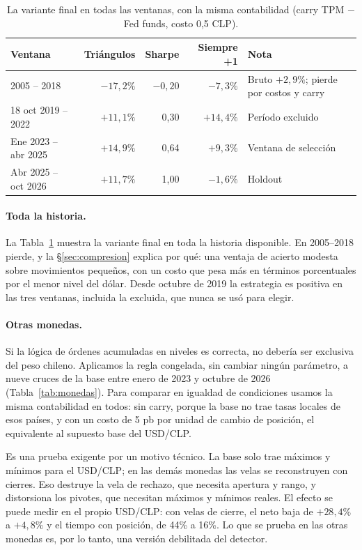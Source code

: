 \documentclass[10pt,a4paper]{article}
\begin{document}
\begin{table}[htbp]\centering\small
\begin{tabular}{@{}lrrrl@{}}
\toprule
Ventana & Triángulos & Sharpe & Siempre +1 & Nota \\
\midrule
2005 -- 2018            & $-17{,}2\%$ & $-0{,}20$ & $-7{,}3\%$  & Bruto $+2{,}9\%$; pierde por costos y carry \\
18 oct 2019 -- 2022     & $+11{,}1\%$ & 0,30      & $+14{,}4\%$ & Período excluido \\
Ene 2023 -- abr 2025    & $+14{,}9\%$ & 0,64      & $+9{,}3\%$  & Ventana de selección \\
Abr 2025 -- oct 2026    & $+11{,}7\%$ & 1,00      & $-1{,}6\%$  & Holdout \\
\bottomrule
\end{tabular}
\caption{La variante final en todas las ventanas, con la misma contabilidad (carry
TPM $-$ Fed funds, costo 0,5 CLP).}\label{tab:todas}
\end{table}

\paragraph{Toda la historia.} La Tabla~\ref{tab:todas} muestra la variante final en
toda la historia disponible. En 2005--2018 pierde, y la §\ref{sec:compresion}
explica por qué: una ventaja de acierto modesta sobre movimientos pequeños, con un
costo que pesa más en términos porcentuales por el menor nivel del dólar.
Desde octubre de 2019 la estrategia es positiva en las tres ventanas, incluida la
excluida, que nunca se usó para elegir.

\paragraph{Otras monedas.} Si la lógica de órdenes acumuladas en niveles es
correcta, no debería ser exclusiva del peso chileno. Aplicamos la regla congelada,
sin cambiar ningún parámetro, a nueve cruces de la base entre enero de 2023 y
octubre de 2026 (Tabla~\ref{tab:monedas}). Para comparar en igualdad de
condiciones usamos la misma contabilidad en todos: sin carry, porque la base no
trae tasas locales de esos países, y con un costo de 5 pb por unidad de cambio de
posición, el equivalente al supuesto base del USD/CLP.

Es una prueba exigente por un motivo técnico. La base solo trae máximos y mínimos
para el USD/CLP; en las demás monedas las velas se reconstruyen con cierres. Eso
destruye la vela de rechazo, que necesita apertura y rango, y distorsiona los
pivotes, que necesitan máximos y mínimos reales. El efecto se puede medir en el
propio USD/CLP: con velas de cierre, el neto baja de $+28{,}4\%$ a $+4{,}8\%$ y el
tiempo con posición, de 44\% a 16\%. Lo que se prueba en las otras monedas es, por
lo tanto, una versión debilitada del detector.
\end{document}
